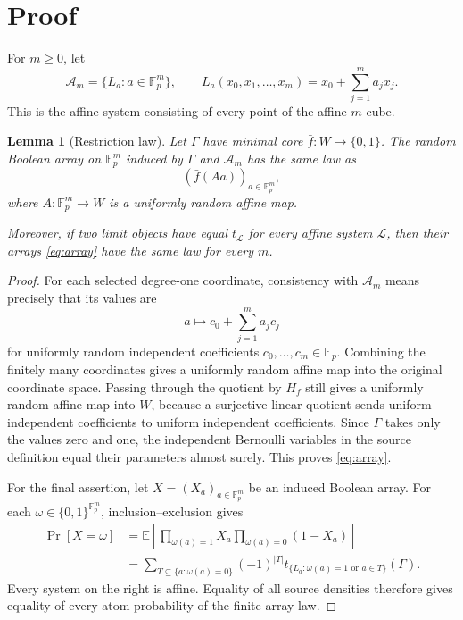 \documentclass[11pt]{article}
\newtheorem{lemma}{Lemma}
\newcommand{\F}{\mathbb F}
\begin{document}
\section{Proof}

For $m\geq0$, let
\begin{equation}\label{eq:fullsystem}
 \mathcal A_m=
 \{L_a:a\in\F_p^m\},
 \qquad
 L_a(x_0,x_1,\ldots,x_m)=x_0+\sum_{j=1}^m a_jx_j.
\end{equation}
This is the affine system consisting of every point of the affine $m$-cube.

\begin{lemma}[Restriction law]\label{lem:law}
Let $\Gamma$ have minimal core $\bar f:W\to\{0,1\}$.  The random Boolean
array on $\F_p^m$ induced by $\Gamma$ and $\mathcal A_m$ has the same law as
\begin{equation}\label{eq:array}
 (\bar f(Aa))_{a\in\F_p^m},
\end{equation}
where $A:\F_p^m\to W$ is a uniformly random affine map.

Moreover, if two limit objects have equal $t_{\mathcal L}$ for every affine
system $\mathcal L$, then their arrays \eqref{eq:array} have the same law for
every $m$.
\end{lemma}

\begin{proof}
For each selected degree-one coordinate, consistency with
$\mathcal A_m$ means precisely that its values are
\[
 a\longmapsto c_0+\sum_{j=1}^m a_jc_j
\]
for uniformly random independent coefficients $c_0,\ldots,c_m\in\F_p$.
Combining the finitely many coordinates gives a uniformly random affine map
into the original coordinate space.  Passing through the quotient by $H_f$
still gives a uniformly random affine map into $W$, because a surjective
linear quotient sends uniform independent coefficients to uniform independent
coefficients.  Since $\Gamma$ takes only the values zero and one, the
independent Bernoulli variables in the source definition equal their
parameters almost surely.  This proves \eqref{eq:array}.

For the final assertion, let $X=(X_a)_{a\in\F_p^m}$ be an induced Boolean
array.  For each $\omega\in\{0,1\}^{\F_p^m}$, inclusion--exclusion gives
\begin{align*}
 \Pr[X=\omega]
 &=\mathbb E\!\left[
   \prod_{\omega(a)=1}X_a\prod_{\omega(a)=0}(1-X_a)\right]\\
 &=\sum_{T\subseteq\{a:\omega(a)=0\}}(-1)^{|T|}
   t_{\{L_a:\omega(a)=1\text{ or }a\in T\}}(\Gamma).
\end{align*}
Every system on the right is affine.  Equality of all source densities
therefore gives equality of every atom probability of the finite array law.
\end{proof}
\end{document}
